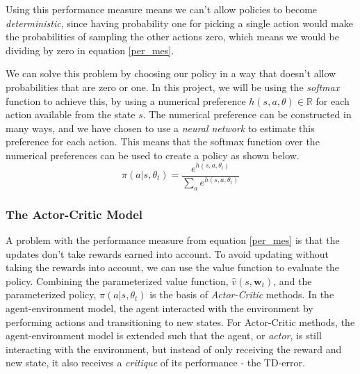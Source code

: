\documentclass[11pt]{article}
\begin{document}
Using this performance measure means we can't allow policies to become \textit{deterministic},
since having probability one for picking a single action would make the probabilities
of sampling the other actions zero, which means we would be dividing by zero
in equation \ref{per_mes}.

We can solve this problem by choosing our policy in a way that doesn't allow probabilities that are zero or one.
In this project, we will be using the \textit{softmax} function to achieve this,
by using a numerical preference $h(s, a, \theta) \in \mathbb{R}$
for each action available from the state $s$.
The numerical preference can be constructed in many ways, and we have chosen to use
a \textit{neural network} to estimate this preference for each action.
This means that the softmax function over the numerical preferences can be used to create a policy
as shown below. 
\begin{equation}\label{eq:soft_max}
    \pi(a | s, \theta_t) = \frac{e^{h(s,a,\theta_t)}}{\sum\limits_{a} e^{h(s,a,\theta_t)}}
\end{equation}

\subsubsection{The Actor-Critic Model}\label{sec:actor_critic}

A problem with the performance measure from equation \ref{per_mes} is that
the updates don't take rewards earned into account. 
To avoid updating without taking the rewards into account, we can
use the value function to evaluate the policy.
Combining the parameterized value function, $\hat{v}(s, \mathbf{w}_t)$,
and the parameterized policy, $\pi(a|s, \theta_t)$ is the basis of \textit{Actor-Critic} methods.
In the agent-environment model, the agent interacted with the environment
by performing actions and transitioning to new states.
For Actor-Critic methods, the agent-environment model is extended such that the agent,
or \textit{actor}, is still interacting with the environment, but
instead of only receiving the reward and new state, it also receives
a \textit{critique} of its performance - the TD-error.
\end{document}
